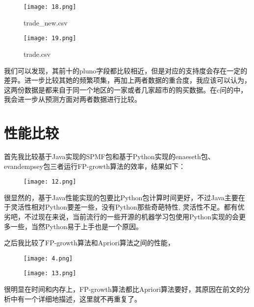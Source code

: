\documentclass{article}
\begin{document}
\begin{CJK}{UTF8}{gbsn}
\begin{figure}[!h]
\begin{center}
  \texttt{[image: 18.png]}
  \caption{trade\_new.csv}	
\end{center}
\end{figure}

\begin{figure}[!h]
\begin{center}
  \texttt{[image: 19.png]}	
  \caption{trade.csv}
\end{center}
\end{figure}

我们可以发现，其前十的pluno字段都比较相近，但是对应的支持度会存在一定的差异。进一步比较其她的频繁项集，再加上两者数据的重合度，我应该可以认为，这两份数据是都来自于同一个地区的一家或者几家超市的购买数据。在c问的中，我会进一步从预测方面对两者数据进行比较。

\section{性能比较}

首先我比较基于Java实现的SPMF包和基于Python实现的enaeseth包、evandempsey包三者运行FP-growth算法的效率，结果如下：

\clearpage
\begin{figure}[!h]
\begin{center}
  \texttt{[image: 12.png]}	
\end{center}
\end{figure}


很显然的，基于Java性能实现的包要比Python包计算时间更好，不过Java主要在于灵活性相对Python要差一些，没有Python那些奇葩特性, 灵活性不足。都有优劣吧，不过现在来说，当前流行的一些开源的机器学习包使用Python实现的会更多一些，当然Python易于上手也是一个原因。

之后我比较了FP-growth算法和Apriori算法之间的性能，

\begin{figure}[!h]
\begin{center}
  \texttt{[image: 4.png]}	
\end{center}
\end{figure}

\begin{figure}[!h]
\begin{center}
  \texttt{[image: 13.png]}	
\end{center}
\end{figure}

很明显在时间和内存上，FP-growth算法都比Apriori算法要好，其原因在前文的分析中有一个详细地描述，这里就不再重复了。

\end{CJK}
\end{document}
